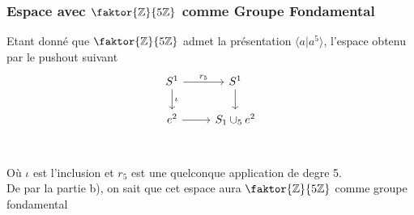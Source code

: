 \documentclass[11pt, a4paper]{article}
\begin{document}
\subsubsection*{ Espace avec $ \faktor { \mathbb{Z}} { 5\mathbb{Z}} $ comme Groupe Fondamental}
Etant donné que $ \faktor { \mathbb{Z}} { 5\mathbb{Z}} $ admet la présentation $ \langle a| a^{5}\rangle$, l'espace obtenu par le pushout suivant
\[\begin{tikzcd}
	{ S^{1}	} & { S^{1}} \\
	{ e^{2}} & { S_1 \cup_5 e^{2}} \\
	\arrow[" r_5 ", from=1-1, to=1-2]
	\arrow[ " \iota", from=1-1, to=2-1]
	\arrow[from=1-2, to=2-2]
	\arrow[from=2-1, to=2-2]
\end{tikzcd}\]
Où $\iota$ est l'inclusion et $r_5$ est une quelconque application de degre 5.\\
De par la partie b), on sait que cet espace aura $ \faktor { \mathbb{Z}} { 5\mathbb{Z}} $ comme groupe fondamental
\end{document}

